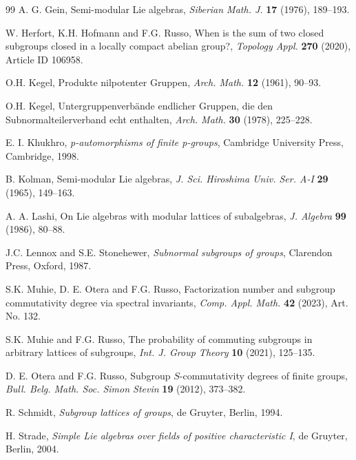 \documentclass{amsart}
\theoremstyle{definition}
\numberwithin{equation}{section}
\begin{document}
\begin{thebibliography}{99}
 A. G. Gein, Semi-modular Lie algebras, \textit{Siberian Math. J.} \textbf{17} (1976), 189--193.



 W. Herfort, K.H. Hofmann and F.G. Russo, When is the sum of two closed subgroups closed in a locally compact abelian group?, \textit{Topology Appl.} \textbf{270} (2020), Article ID 106958. 



 O.H. Kegel, Produkte nilpotenter Gruppen, \textit{Arch. Math.} \textbf{12}  (1961), 90--93.

 O.H. Kegel, Untergruppenverbände endlicher Gruppen, die den Subnormalteilerverband echt enthalten, \textit{Arch. Math.} \textbf{30} (1978), 225--228. 


 E. I. Khukhro, \textit{p-automorphisms of finite p-groups}, Cambridge University Press, Cambridge,  1998.

 B. Kolman, Semi-modular Lie algebras, \textit{J. Sci. Hiroshima Univ. Ser. A-I} \textbf{29} (1965), 149--163.

 A. A. Lashi, On Lie algebras with modular lattices of subalgebras, \textit{J. Algebra} \textbf{99} (1986),  80--88.

J.C. Lennox and S.E. Stonehewer, \textit{Subnormal subgroups of groups},  Clarendon Press, Oxford, 1987.  

 S.K. Muhie, D. E. Otera and F.G. Russo, Factorization number and subgroup commutativity degree via spectral invariants, \textit{Comp. Appl. Math.} \textbf{42} (2023), Art. No. 132.


 S.K. Muhie and F.G. Russo, The probability of commuting subgroups in arbitrary  lattices of subgroups, \textit{Int. J. Group Theory}  \textbf{10} (2021),  125--135.

D. E. Otera and F.G. Russo, Subgroup $S$-commutativity degrees of finite groups, \textit{Bull. Belg. Math. Soc. Simon Stevin} \textbf{19} (2012), 373--382.







   R. Schmidt, \textit{Subgroup lattices of groups}, de Gruyter, Berlin, 1994.

 H. Strade,  \textit{Simple Lie algebras over fields of positive characteristic I}, de Gruyter, Berlin, 2004.



\end{thebibliography}
\end{document}
